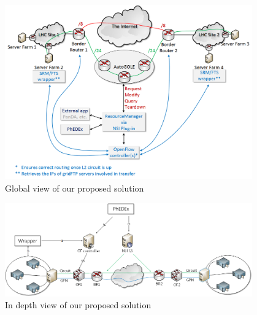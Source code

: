 \begin{figure}[h]
  \centering
  \includegraphics[width=0.95\textwidth]{Figures/Proposed_solution-global_view.png}
  \caption{Global view of our proposed solution}
  \label{fig:global-solution-view}
\end{figure} 

\begin{figure}[h]
  \centering
  \includegraphics[width=0.95\textwidth]{Figures/Proposed_solution-zoom_view.png}
  \caption{In depth view of our proposed solution}
  \label{fig:zoom-solution-view}
\end{figure} 